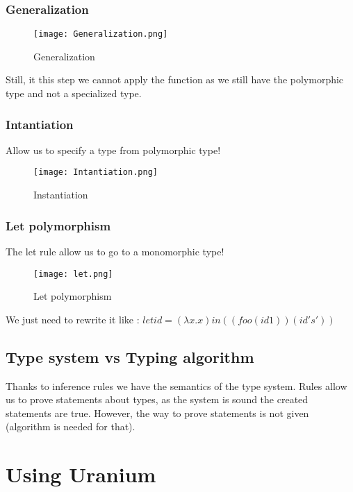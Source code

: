         \subsubsection{Generalization}
            \begin{figure}[H]
                \centering
                \texttt{[image: Generalization.png]}
                \caption{Generalization}
                \label{fig:Generalization}
            \end{figure}
            Still, it this step we cannot apply the function as we still have
            the polymorphic type and not a specialized type.
        \subsubsection{Intantiation}
            Allow us to specify a type from polymorphic type!
            \begin{figure}[H]
                \centering
                \texttt{[image: Intantiation.png]}
                \caption{Instantiation}
                \label{fig:instantiation}
            \end{figure}

        \subsubsection{Let polymorphism}
            The let rule allow us to go to a monomorphic type!
            \begin{figure}[H]
                 \centering
                 \texttt{[image: let.png]}
                 \caption{Let polymorphism}
                 \label{fig:let}
            \end{figure}
            We just need to rewrite it like : 
            $let id = (\lambda x . x) in ((foo (id 1)) (id 's'))$
    \subsection{Type system vs Typing algorithm}
        Thanks to inference rules we have the semantics of the type system.
        Rules allow us to prove statements about types, as the system is sound
        the created statements are true. However, the way to prove statements is
        not given (algorithm is needed for that).
\section{Using Uranium}
